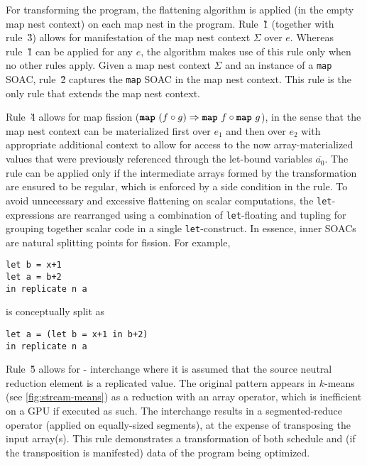For transforming the program, the flattening algorithm
is applied (in the empty map nest context) on each map nest in
the program.
%
Rule~\G{1} (together with rule~\G{3}) allows for manifestation of the
map nest context $\Sigma$ over $e$. Whereas rule~\G{1} can be applied
for any $e$, the algorithm makes use of this rule only when no other
rules apply.
%
Given a map nest context $\Sigma$ and an instance of a \texttt{map}
SOAC, rule~\G{2} captures the \texttt{map} SOAC in the
map nest context. This rule is the only rule that extends the map
nest context.


Rule~\G{4} allows for map fission
($\mbox{\texttt{\bfseries{map}}}~(f\circ g) \Rightarrow \mbox{\texttt{\bfseries{map}}}~f\circ \mbox{\texttt{\bfseries{map}}}~g$), in the sense that
the map nest context can be materialized first over $e_1$ and then
over $e_2$ with appropriate additional context to allow for access to
the now array-materialized values that were previously referenced
through the let-bound variables $\overline{a_0}$. The rule can be
applied only if the intermediate arrays formed by the transformation
are ensured to be regular, which is enforced by a side condition in
the rule. To avoid unnecessary and excessive flattening on scalar
computations, the \lstinline{let}-expressions are rearranged using a
combination of \lstinline{let}-floating
\cite{PeytonJones:1996:LMB:232627.232630} and tupling for grouping
together scalar code in a single \lstinline{let}-construct.  In
essence, inner SOACs are natural splitting points for fission.  For
example,
\begin{lstlisting}[aboveskip=-0.6\baselineskip]
let b = x+1
let a = b+2
in replicate n a
\end{lstlisting}
is conceptually split as
\begin{lstlisting}[aboveskip=-0.5\baselineskip]
let a = (let b = x+1 in b+2)
in replicate n a
\end{lstlisting}

Rule~\G{5} allows for - interchange where it is
assumed that the source neutral reduction element is a replicated
value.  The original pattern appears in $k$-means (see
\cref{fig:stream-means}) as a reduction with an array operator, which
is inefficient on a GPU if executed as such. The interchange results
in a segmented-reduce operator (applied on equally-sized segments), at
the expense of transposing the input array(s).  This rule demonstrates
a transformation of both schedule and (if the transposition is
manifested) data of the program being optimized.

